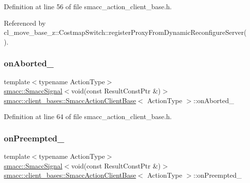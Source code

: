 Definition at line 56 of file smacc\+\_\+action\+\_\+client\+\_\+base.\+h.



Referenced by cl\+\_\+move\+\_\+base\+\_\+z\+::\+Costmap\+Switch\+::register\+Proxy\+From\+Dynamic\+Reconfigure\+Server().

\mbox{\label{classsmacc_1_1client__bases_1_1SmaccActionClientBase_adc33748ca4fcef9730f8039b75d496d0}} 
\subsubsection{\texorpdfstring{on\+Aborted\+\_\+}{onAborted\_}}
{\footnotesize\ttfamily template$<$typename Action\+Type$>$ \\
\hyperlink{classsmacc_1_1SmaccSignal}{smacc\+::\+Smacc\+Signal}$<$void(const Result\+Const\+Ptr \&)$>$ \hyperlink{classsmacc_1_1client__bases_1_1SmaccActionClientBase}{smacc\+::client\+\_\+bases\+::\+Smacc\+Action\+Client\+Base}$<$ Action\+Type $>$\+::on\+Aborted\+\_\+}



Definition at line 64 of file smacc\+\_\+action\+\_\+client\+\_\+base.\+h.

\mbox{\label{classsmacc_1_1client__bases_1_1SmaccActionClientBase_a23846f928b48b5da809690883044b14b}} 
\subsubsection{\texorpdfstring{on\+Preempted\+\_\+}{onPreempted\_}}
{\footnotesize\ttfamily template$<$typename Action\+Type$>$ \\
\hyperlink{classsmacc_1_1SmaccSignal}{smacc\+::\+Smacc\+Signal}$<$void(const Result\+Const\+Ptr \&)$>$ \hyperlink{classsmacc_1_1client__bases_1_1SmaccActionClientBase}{smacc\+::client\+\_\+bases\+::\+Smacc\+Action\+Client\+Base}$<$ Action\+Type $>$\+::on\+Preempted\+\_\+}



